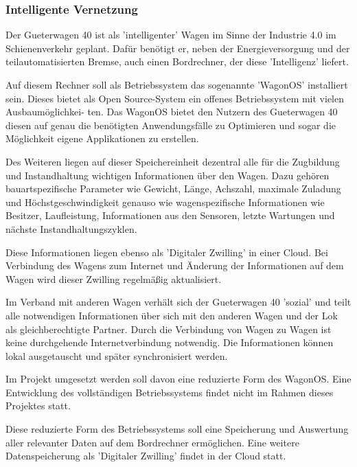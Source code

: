\subsubsection{Intelligente Vernetzung}
Der \gls{Gueterwagen 40} ist als 'intelligenter' Wagen im Sinne der Industrie 4.0 im Schienenverkehr geplant. Dafür benötigt er, neben der Energieversorgung und der teilautomatisierten Bremse, auch einen Bordrechner, der diese 'Intelligenz' liefert.\par
Auf diesem Rechner soll als Betriebssystem das sogenannte '\gls{WagonOS}' installiert sein. Dieses bietet als Open Source-System ein offenes Betriebssystem mit vielen Ausbaumöglichkei- ten. Das \gls{WagonOS} bietet den Nutzern des \gls{Gueterwagen 40}  diesen auf genau die benötigten Anwendungsfälle zu Optimieren und sogar die Möglichkeit eigene Applikationen zu erstellen.\par
Des Weiteren liegen auf dieser Speichereinheit dezentral alle für die Zugbildung und Instandhaltung wichtigen Informationen über den Wagen. Dazu gehören bauartspezifische Parameter wie Gewicht, Länge, Achszahl, maximale Zuladung und Höchstgeschwindigkeit genauso wie wagenspezifische Informationen wie Besitzer, Laufleistung, Informationen aus den Sensoren, letzte Wartungen und nächste Instandhaltungszyklen.\par
Diese Informationen liegen ebenso als 'Digitaler Zwilling' in einer Cloud. Bei Verbindung des Wagens zum Internet und Änderung der Informationen auf dem Wagen wird dieser Zwilling regelmäßig aktualisiert.\par
Im Verband mit anderen Wagen verhält sich der \gls{Gueterwagen 40} 'sozial' und teilt alle notwendigen Informationen über sich mit den anderen Wagen und der Lok als gleichberechtigte Partner. Durch die Verbindung von Wagen zu Wagen ist keine durchgehende Internetverbindung notwendig. Die Informationen können lokal ausgetauscht und später synchronisiert werden.\par
Im Projekt umgesetzt werden soll davon eine reduzierte Form des \gls{WagonOS}. Eine Entwicklung des vollständigen Betriebssystems findet nicht im Rahmen dieses Projektes statt.\par
Diese reduzierte Form des Betriebssystems soll eine Speicherung und Auswertung aller relevanter Daten auf dem Bordrechner ermöglichen. Eine weitere Datenspeicherung als 'Digitaler Zwilling' findet in der Cloud statt.

